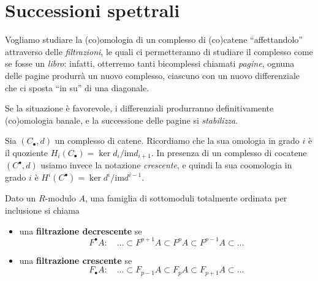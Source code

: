 \chapter{Successioni spettrali}

Vogliamo studiare la (co)omologia di un complesso di (co)catene 
``affettandolo'' attraverso delle \emph{filtrazioni},
le quali ci permetteranno di studiare il complesso come se fosse un \emph{libro}:
infatti, otterremo tanti bicomplessi chiamati \emph{pagine},
ognuna delle pagine produrrà un nuovo complesso,
ciascuno con un nuovo differenziale che ci sposta ``in su'' di una diagonale.


%
%

Se la situazione è favorevole, i differenziali produrranno definitivamente
(co)omologia banale, e la successione delle pagine si \emph{stabilizza}.


Sia $(C_{\bullet}, d)$ un complesso di catene.
Ricordiamo che la sua omologia in grado $i$ è il quoziente 
$H_{i}(C_{\bullet}) = \ker d_{i}/\mathrm{im} d_{i+1}$.
In presenza di un complesso di cocatene $(C^{\bullet},d)$
usiamo invece la notazione \emph{crescente},
e quindi la sua coomologia in grado $i$ è 
$H^{i}(C^{\bullet}) = \ker d^{i}/\mathrm{im} d^{i-1}$.

\begin{df}
	Dato un $R$-modulo $A$, una famiglia di sottomoduli 
	totalmente ordinata per inclusione si chiama
	\begin{itemize}
		\item una \textbf{filtrazione decrescente} se 
			\begin{equation*}
				F^{\bullet}A : \quad
				\dots \subset F^{p+1}A \subset F^{p}A \subset F^{p-1}A \subset \dots
			\end{equation*}
			
		\item una \textbf{filtrazione crescente} se 
			\begin{equation*}
				F_{\bullet}A : \quad
				\dots \subset F_{p-1}A \subset F_{p}A \subset F_{p+1}A \subset \dots
			\end{equation*}
	\end{itemize}
\end{df}


